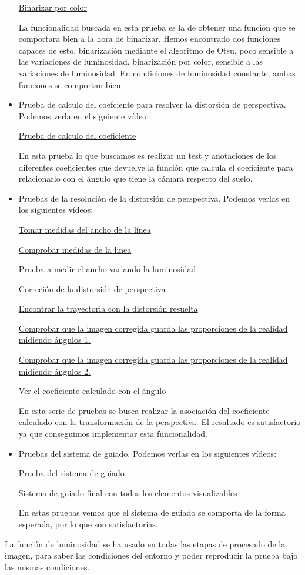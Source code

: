 \begin{itemize}
	\href{https://youtu.be/Rks5PkxDeZQ}{Binarizar por color}
	
	La funcionalidad buscada en esta prueba es la de obtener una función que se comportara bien a la hora de binarizar. Hemos encontrado dos funciones capaces de esto, binarización mediante el algoritmo de Otsu, poco sensible a las variaciones de luminosidad, binarización por color, sensible a las variaciones de luminosidad. En condiciones de luminosidad constante, ambas funciones se comportan bien.
	
	\item Prueba de calculo del coefciente para resolver la distorsión de perspectiva. Podemos verla en el siguiente vídeo: 
	
	\href{https://youtu.be/Y9QgFIMXSiU}{Prueba de calculo del coeficiente}
	
	En esta prueba lo que buscamos es realizar un test y anotaciones de los diferentes coeficientes que devuelve la función que calcula el coeficiente para relacionarlo con el ángulo que tiene la cámara respecto del suelo.	
	
	\item Pruebas de la resolución de la distorsión de perspectiva. Podemos verlas en los siguientes vídeos:
	
	\href{https://youtu.be/rUQrHbA_H8A}{Tomar medidas del ancho de la línea}
	
	\href{https://youtu.be/ClA-Ei8f18o}{Comprobar medidas de la linea}
	
	\href{https://youtu.be/m7t4dcfuFeo}{Prueba a medir el ancho variando la luminosidad}
	
	\href{https://youtu.be/Y9QgFIMXSiU}{Correción de la distorsión de perspectiva}
	
	\href{https://youtu.be/Ae5aTr3mg6k}{Encontrar la trayectoria con la distorsión resuelta}
	
	\href{https://youtu.be/wc00piNmfyI}{Comprobar que la imagen corregida guarda las proporciones de la realidad midiendo ángulos 1.}
	
	\href{https://youtu.be/T0djIwql6G8}{Comprobar que la imagen corregida guarda las proporciones de la realidad midiendo ángulos 2.}
	
	\href{https://youtu.be/pRE8zerfp7E}{Ver el coeficiente calculado con el ángulo}
	
	En esta serie de pruebas se busca realizar la asociación del coeficiente calculado con la transformación de la perspectiva. El resultado es satisfactorio ya que conseguimos implementar esta funcionalidad.
	
	\item Pruebas del sistema de guiado. Podemos verlas en los siguientes vídeos:
	
	\href{https://youtu.be/ODr3q91MLk0}{Prueba del sistema de guiado}
	
	\href{https://youtu.be/8j69cDydXfA}{Sistema de guiado final con todos los elementos visualizables}
	
	En estas pruebas vemos que el sistema de guiado se comporta de la forma esperada, por lo que son satisfactorias.
	
\end{itemize}

La función de luminosidad se ha usado en todas las etapas de procesado de la imagen, para saber las condiciones del entorno y poder reproducir la prueba bajo las mismas condiciones.
